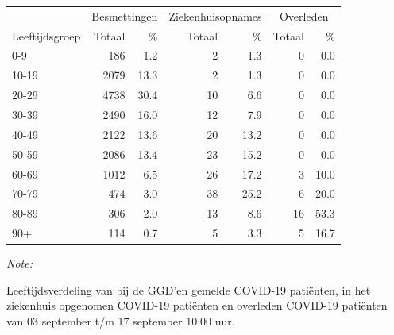 \documentclass[
  english,
  man,floatsintext]{apa6}
\begin{document}
\begin{table}[H]
\centering\begingroup\fontsize{11}{13}\selectfont

\begin{threeparttable}
\begin{tabular}{lrrrrrr}
\toprule
\multicolumn{1}{c}{ } & \multicolumn{2}{c}{Besmettingen} & \multicolumn{2}{c}{Ziekenhuisopnames} & \multicolumn{2}{c}{Overleden} \\
\cmidrule(l{3pt}r{3pt}){2-3} \cmidrule(l{3pt}r{3pt}){4-5} \cmidrule(l{3pt}r{3pt}){6-7}
Leeftijdsgroep & Totaal & \% & Totaal & \% & Totaal & \%\\
\midrule
0-9 & 186 & 1.2 & 2 & 1.3 & 0 & 0.0\\
10-19 & 2079 & 13.3 & 2 & 1.3 & 0 & 0.0\\
20-29 & 4738 & 30.4 & 10 & 6.6 & 0 & 0.0\\
30-39 & 2490 & 16.0 & 12 & 7.9 & 0 & 0.0\\
40-49 & 2122 & 13.6 & 20 & 13.2 & 0 & 0.0\\
50-59 & 2086 & 13.4 & 23 & 15.2 & 0 & 0.0\\
60-69 & 1012 & 6.5 & 26 & 17.2 & 3 & 10.0\\
70-79 & 474 & 3.0 & 38 & 25.2 & 6 & 20.0\\
80-89 & 306 & 2.0 & 13 & 8.6 & 16 & 53.3\\
90+ & 114 & 0.7 & 5 & 3.3 & 5 & 16.7\\
\bottomrule
\end{tabular}
\begin{tablenotes}
\item \textit{Note: } 
\item Leeftijdsverdeling van bij de GGD’en gemelde COVID-19 patiënten, in het ziekenhuis opgenomen COVID-19 patiënten en overleden COVID-19 patiënten van 03 september t/m 17 september 10:00 uur.
\end{tablenotes}
\end{threeparttable}
\endgroup{}
\end{table}
\end{document}
